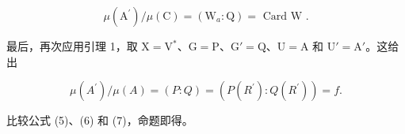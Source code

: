 \[
\mu \left(\mathrm{A} ^ {\prime}\right) / \mu (\mathrm{C}) = \left(\mathrm{W} _ {a}: \mathrm{Q}\right) = \text { Card   W }.\tag{6}
\]

最后，再次应用引理 1，取 \(\mathrm{X} = \mathrm{V}^*\)、\(\mathrm{G} = \mathrm{P}\)、\(\mathrm{G}' = \mathrm{Q}\)、\(\mathrm{U} = \mathrm{A}\) 和 \(\mathrm{U}' = \mathrm{A}'\)。这给出

\[
\mu (A ^ {\prime}) / \mu (A) = (P: Q) = (P (R ^ {\prime}): Q (R ^ {\prime})) = f.\tag{7}
\]

比较公式 (5)、(6) 和 (7)，命题即得。


